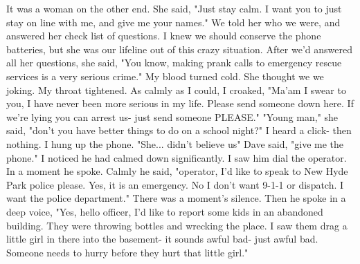 \documentclass[a4paper]{article}
\begin{document}
It was a woman on the other end. She said, "Just stay calm. I want you to just stay on line with me, and give me your names."
We told her who we were, and answered her check list of questions. I knew we should conserve the phone batteries, but she was our lifeline out of this crazy situation.
After we'd answered all her questions, she said, "You know, making prank calls to emergency rescue services is a very serious crime."
My blood turned cold. She thought we we joking. My throat tightened.
As calmly as I could, I croaked, "Ma'am I swear to you, I have never been more serious in my life. Please send someone down here. If we're lying you can arrest us- just send someone PLEASE."
"Young man," she said, "don't you have better things to do on a school night?"
I heard a click- then nothing.
I hung up the phone. "She... didn't believe us"
Dave said, "give me the phone."
I noticed he had calmed down significantly.
I saw him dial the operator. In a moment he spoke. Calmly he said, "operator, I'd like to speak to New Hyde Park police please. Yes, it is an emergency. No I don't want 9-1-1 or dispatch. I want the police department."
There was a moment's silence. Then he spoke in a deep voice, "Yes, hello officer, I'd like to report some kids in an abandoned building. They were throwing bottles and wrecking the place. I saw them drag a little girl in there into the basement- it sounds awful bad- just awful bad. Someone needs to hurry before they hurt that little girl."
\end{document}
